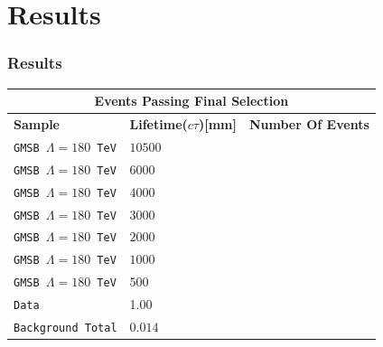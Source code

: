 \documentclass{beamer}
\begin{document}
\section{Results}
\begin{frame}
\frametitle{\Huge{Results}}
\begin{minipage}[t]{0.8\textwidth}
\centering
\begin{tabular}{l l l}
\multicolumn{3}{c}{\bfseries{Events Passing Final Selection}} \\
  \hline
   \bfseries{Sample} &\bfseries{Lifetime($c\tau$)[mm]} &\bfseries{Number Of Events} \\
   \hline
   \texttt{GMSB $\Lambda=180$ TeV}& $10500$ & \\
   \texttt{GMSB $\Lambda=180$ TeV}& $ 6000$ &  \\
   \texttt{GMSB $\Lambda=180$ TeV}& $ 4000$&  \\
   \texttt{GMSB $\Lambda=180$ TeV}& $ 3000 $&   \\
   \texttt{GMSB $\Lambda=180$ TeV}& $ 2000$&   \\
   \texttt{GMSB $\Lambda=180$ TeV}& $ 1000$&  \\
   \texttt{GMSB $\Lambda=180$ TeV}& $ 500$&  \\
   \hline
   \texttt{Data} & 1.00 &    \\
   \texttt{Background Total} & $0.014$ & \\
  \hline \hline
 \end{tabular} 
 \end{minipage}
\end{frame}
\end{document}
